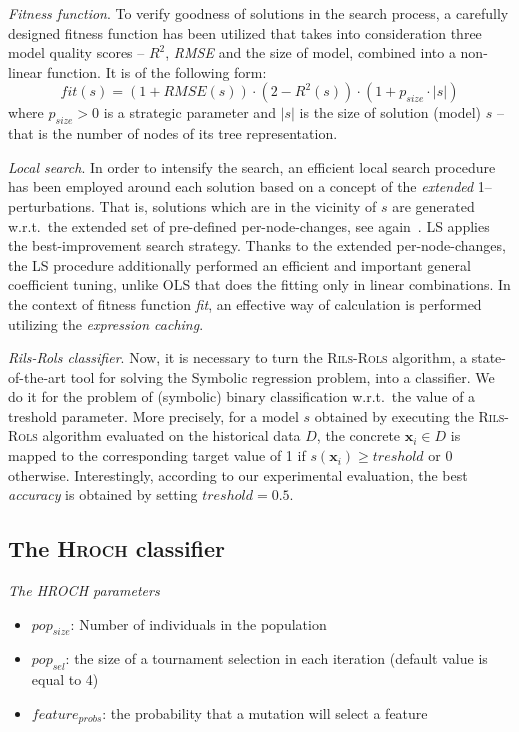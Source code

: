 \documentclass{bmcart}
\begin{document}
 
 \textit{Fitness function}. To verify goodness of solutions in the search process, a carefully designed fitness function has been utilized that takes into consideration three model quality scores -- $R^2$, \emph{RMSE} and the size of model, combined into a non-linear function. It is of the following form:
 \begin{equation}\label{eq:fitness-rils-rols} 
 	 fit(s) = (1+ RMSE(s)) \cdot (2-R^2(s)) \cdot (1+ p_{size} \cdot |s|)
 \end{equation}
where  $p_{size}>0$ is a strategic parameter and $|s|$ is the size of solution (model) $s$ -- that is the number of nodes of its tree representation. 

  \emph{Local search}. In order to intensify the search, an efficient local search procedure has been employed around each solution based on a concept of the \emph{extended} 1--perturbations. That is,   solutions which are in the vicinity of $s$ are generated w.r.t.\ the extended set of pre-defined per-node-changes, see again~\cite{kartelj2023rils}.  LS applies the best-improvement search strategy.  Thanks to the extended  per-node-changes, the LS procedure additionally performed an efficient and  important general coefficient tuning, unlike OLS that does the fitting only in linear combinations.  In the context of fitness function \emph{fit}, an effective way of calculation is performed utilizing the \emph{expression caching}. 
 
 \emph{Rils-Rols classifier}.  Now, it is necessary to turn the \textsc{Rils}-\textsc{Rols} algorithm, a state-of-the-art tool for solving the Symbolic regression problem, into a classifier. We do it for the problem of (symbolic) binary classification w.r.t.\ the value of a treshold parameter. More precisely, for a model $s$ obtained by executing the \textsc{Rils}-\textsc{Rols} algorithm evaluated on the historical data $D$, the concrete $\textbf{x}_i \in D$ is mapped to the corresponding target value of 1 if $s(\textbf{x}_i) \geq treshold$ or 0 otherwise. Interestingly, according to our experimental evaluation, the best \textit{accuracy} is  obtained by setting $treshold=0.5$. 
  
 \subsection{The \textsc{Hroch}  classifier}
\textit{ The HROCH parameters}  %
 \begin{itemize}
 	\item $pop_{size}$: Number of individuals in the population
 	\item $pop_{sel}$:  the size of a tournament selection in each iteration (default value is equal to 4)
 	\item $feature_{probs}$: the probability that a mutation will select a feature
 \end{itemize}
 
\end{document}
